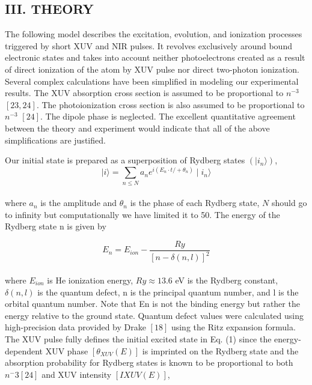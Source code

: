 \documentclass[7pt]{article}
\begin{document}
\begin{multicols}{2}
\small{}
\centering{}
     \section*{\normalsize{III. THEORY}}

\justify{}
The following model describes the excitation, evolution, and ionization processes triggered by short XUV and NIR pulses. It revolves exclusively around bound electronic states and takes into account neither photoelectrons created as a result of direct ionization of the atom by XUV pulse nor direct two-photon ionization. Several complex calculations have been simplified in modeling our experimental results. The XUV absorption cross section is assumed to be proportional to $n^{-3}$ $[23,24]$. The photoionization cross section is also assumed to be proportional to $n^{-3}$ $[24]$. The dipole phase is neglected. The excellent quantitative agreement between the theory and experiment would indicate that all of the above simplifications are justified.

Our initial state is prepared as a superposition of Rydberg states $(\mid i_{n}\rangle)$,\\

    \begin{equation}
        \mid i \rangle = \sum_{n \leq N} a_{n} e^{i(E_{n} \cdot t/ + \theta_{n})} \mid i_{n}\rangle
    \end{equation}
\\

where $a_n$ is the amplitude and $\theta_n$ is the phase of each Rydberg state, $N$ should go to infinity but computationally we
have limited it to 50. The energy of the Rydberg state n is given by

\newpage
\fancyhf{}
\fancyhead{}
\thispagestyle{Pagina3}

    \begin{equation}
        E_n = E_{ion} - \frac{Ry}{[n - \delta(n,l)]^2}
    \end{equation}
\\
where $E_{ion}$ is He ionization energy, $Ry \approx 13.6$ eV is the Rydberg constant, $\delta(n,l)$ is the quantum defect, n is the principal quantum number, and l is the orbital quantum number. Note that En is not the binding energy but rather the energy relative to the ground state. Quantum defect values were calculated
using high-precision data provided by Drake $[18]$ using the Ritz expansion formula. The XUV pulse fully defines the initial excited state in Eq. (1) since the energy-dependent
XUV phase $[\theta _{XUV}(E)]$ is imprinted on the Rydberg state and the absorption probability for Rydberg states is known to be proportional to both $n^-3 [24]$ and XUV intensity $[IXUV(E)]$,


\end{multicols}
\end{document}
